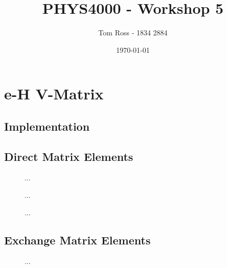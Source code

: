 \documentclass{article}
\title{PHYS4000 - Workshop 5}
\author{Tom Ross - 1834 2884}
\date{\today}
\begin{document}
\tableofcontents

\listoffigures

\listoftables

\clearpage

\section{e-H V-Matrix}
\label{sec:e-h-v-matrix}

\subsection{Implementation}
\label{sec:implementation}

\subsection{Direct Matrix Elements}
\label{sec:dir-me}

\begin{figure}[h]
  \begin{center}
    
  \end{center}
  \caption[Direct Matrix Elements 1s-1s]{
    ...
  }
  \label{fig:dir-me-1s-1s}
\end{figure}

\begin{figure}[h]
  \begin{center}
    
  \end{center}
  \caption[Direct Matrix Elements 1s-2s]{
    ...
  }
  \label{fig:dir-me-1s-2s}
\end{figure}

\begin{figure}[h]
  \begin{center}
    
  \end{center}
  \caption[Direct Matrix Elements 1s-3s]{
    ...
  }
  \label{fig:dir-me-1s-3s}
\end{figure}

\clearpage

\subsection{Exchange Matrix Elements}
\label{sec:exc-me}

\begin{figure}[h]
  \begin{center}
    
  \end{center}
  \caption[Exchange Matrix Elements 1s-1s]{
    ...
  }
  \label{fig:exc-me-1s-1s}
\end{figure}
\end{document}
